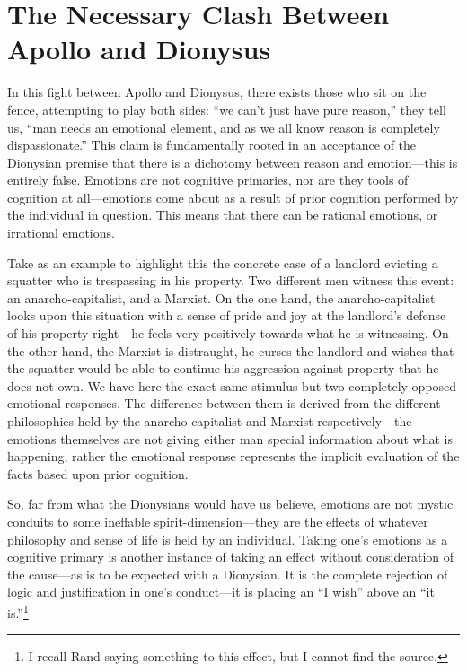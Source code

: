\documentclass[11pt]{article}
\begin{document}
\section{The Necessary Clash Between Apollo and Dionysus}
\label{sec:orgf4af48c}
In this fight between Apollo and Dionysus, there exists those who sit on the fence, attempting to play both sides: ``we can't just have pure reason,'' they tell us, ``man needs an emotional element, and as we all know reason is completely dispassionate.'' This claim is fundamentally rooted in an acceptance of the Dionysian premise that there is a dichotomy between reason and emotion---this is entirely false. Emotions are not cognitive primaries, nor are they tools of cognition at all---emotions come about as a result of prior cognition performed by the individual in question. This means that there can be rational emotions, or irrational emotions.

Take as an example to highlight this the concrete case of a landlord evicting a squatter who is trespassing in his property. Two different men witness this event: an anarcho-capitalist, and a Marxist. On the one hand, the anarcho-capitalist looks upon this situation with a sense of pride and joy at the landlord's defense of his property right---he feels very positively towards what he is witnessing. On the other hand, the Marxist is distraught, he curses the landlord and wishes that the squatter would be able to continue his aggression against property that he does not own. We have here the exact same stimulus but two completely opposed emotional responses. The difference between them is derived from the different philosophies held by the anarcho-capitalist and Marxist respectively---the emotions themselves are not giving either man special information about what is happening, rather the emotional response represents the implicit evaluation of the facts based upon prior cognition.

So, far from what the Dionysians would have us believe, emotions are not mystic conduits to some ineffable spirit-dimension---they are the effects of whatever philosophy and sense of life is held by an individual. Taking one's emotions as a cognitive primary is another instance of taking an effect without consideration of the cause---as is to be expected with a Dionysian. It is the complete rejection of logic and justification in one's conduct---it is placing an ``I wish'' above an ``it is.''\footnote{I recall Rand saying something to this effect, but I cannot find the source.}
\end{document}

